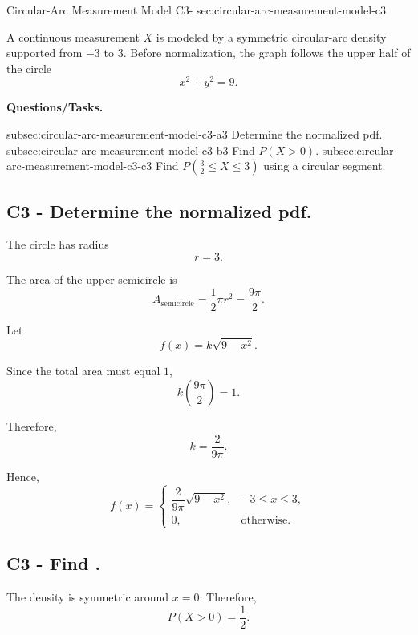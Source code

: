 	\sectionScored
	{Circular-Arc Measurement Model}
	{C3-}
	{sec:circular-arc-measurement-model-c3}
	{
	A continuous measurement $X$ is modeled by a symmetric circular-arc density supported from $-3$ to $3$. Before normalization, the graph follows the upper half of the circle
	\[
	x^2+y^2=9.
	\]
	
	\textbf{Questions/Tasks.}
	\begin{enumerate}
		\CriterionTask
		{subsec:circular-arc-measurement-model-c3-a}{3}
		{Determine the normalized pdf. }
		\CriterionTask
		{subsec:circular-arc-measurement-model-c3-b}{3}
		{Find $P(X>0)$. }
		\CriterionTask
		{subsec:circular-arc-measurement-model-c3-c}{3}
		{Find $P(\frac{3}{2}\le X\le3)$ using a circular segment. }
	\end{enumerate}
	
	\label{subsec:circular-arc-measurement-model-c3-a}
	\subsection*{C3 - Determine the normalized pdf. }
	
	The circle has radius
	\[
	r=3.
	\]
	
	The area of the upper semicircle is
	\[
	A_{\text{semicircle}}
	=\frac{1}{2}\pi r^2
	=\frac{9\pi}{2}.
	\]
	
	Let
	\[
	f(x)=k\sqrt{9-x^2}.
	\]
	
	Since the total area must equal $1$,
	\[
	k\left(\frac{9\pi}{2}\right)=1.
	\]
	
	Therefore,
	\[
	k=\frac{2}{9\pi}.
	\]
	
	Hence,
	\[
	f(x)=
	\begin{cases}
		\dfrac{2}{9\pi}\sqrt{9-x^2}, & -3\le x\le3,\\[6pt]
		0, & \text{otherwise.}
	\end{cases}
	\]
	

	\label{subsec:circular-arc-measurement-model-c3-b}
	\subsection*{C3 - Find . }
	
	The density is symmetric around $x=0$. Therefore,
	\[
	P(X>0)=\frac{1}{2}.
	\]
	

}
